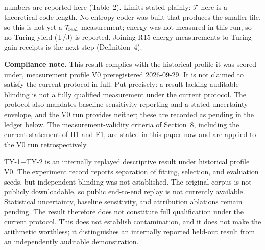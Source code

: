 \documentclass[11pt]{article}
\begin{document}
numbers are reported here (Table~2). Limits stated plainly: $\mathcal{T}$ here is a theoretical code length. No entropy coder was built that produces the smaller file, so this is not yet a \(\mathcal{T}_{\rm real}\) measurement; energy was not measured in this run, so no Turing yield (T/J) is reported. Joining R15 energy measurements to Turing-gain receipts is the next step (Definition~4).

\textbf{Compliance note.} This result complies with the historical profile it was scored under, measurement profile V0 preregistered 2026-09-29. It is not claimed to satisfy the current protocol in full. Put precisely: a result lacking auditable blinding is not a fully qualified measurement under the current protocol. The protocol also mandates baseline-sensitivity reporting and a stated uncertainty envelope, and the V0 run provides neither; these are recorded as pending in the ledger below. The measurement-validity criteria of Section~8, including the current statement of H1 and F1, are stated in this paper now and are applied to the V0 run retrospectively.

TY-1+TY-2 is an internally replayed descriptive result under historical profile V0. The experiment record reports separation of fitting, selection, and evaluation seeds, but independent blinding was not established. The original corpus is not publicly downloadable, so public end-to-end replay is not currently available. Statistical uncertainty, baseline sensitivity, and attribution ablations remain pending. The result therefore does not constitute full qualification under the current protocol. This does not establish contamination, and it does not make the arithmetic worthless; it distinguishes an internally reported held-out result from an independently auditable demonstration.
\end{document}
